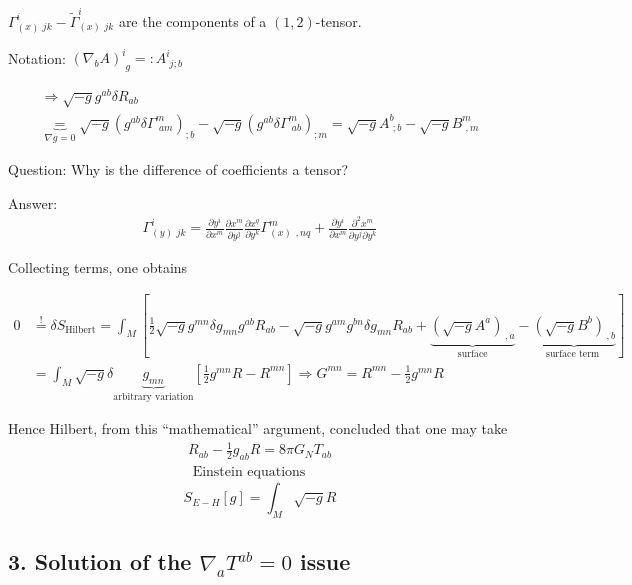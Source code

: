 \documentclass[10pt, twoside]{amsart}
\begin{document}
\begin{multicols*}{2}
$\Gamma^i_{(x) \, \, jk } - \widetilde{\Gamma}^i_{ (x) \, \, jk }$ are the components of a $(1,2)$-tensor.

Notation: $(\nabla_b A)^i_{ \, \, g} =: A^i_{ \, \, j;b}$

\[
\begin{gathered}
\Longrightarrow \sqrt{-g} g^{ab} \delta R_{ab}  \\
\underbrace{=}_{ \nabla g = 0 } \sqrt{-g} (g^{ab} \delta \Gamma^m_{ \, \, am} )_{;b} - \sqrt{-g} (g^{ab} \delta \Gamma^m_{ \, \, ab} )_{ ; m} = \sqrt{-g} A^b_{ \, \, ; b} - \sqrt{-g} B^m_{ \, \, , m }
\end{gathered}
\]

Question: Why is the difference of coefficients a tensor?

Answer:
\[
\begin{aligned}
\Gamma_{(y) \, \, jk}^i = \frac{ \partial y^i}{ \partial x^m} \frac{ \partial x^m}{ \partial y^j} \frac{ \partial x^q}{ \partial y^k} \Gamma^m_{(x) \,\ , nq} + \frac{ \partial y^i}{ \partial x^m} \frac{ \partial^2 x^m}{ \partial y^j \partial y^k}
\end{aligned}
\]

Collecting terms, one obtains

\[
\begin{aligned}
  0 & \overset{!}{=} \delta S_{\text{Hilbert}} = \int_M [ \frac{1}{2} \sqrt{-g} g^{mn} \delta g_{mn} g^{ab} R_{ab} - \sqrt{-g} g^{am} g^{bn} \delta g_{mn} R_{ab}+    \underbrace{ (\sqrt{-g}A^a)_{ \, , a} }_{ \text{surface} } - \underbrace{ ( \sqrt{-g} B^b)_{ \, , b } }_{ \text{surface term } } ] \\
  & = \int_M \sqrt{-g} \delta \underbrace{g_{mn}}_{ \text{arbitrary variation}} [ \frac{1}{2} g^{mn} R - R^{mn} ] \Longrightarrow G^{mn} = R^{mn} - \frac{1}{2} g^{mn} R
\end{aligned}
\]

Hence Hilbert, from this ``mathematical'' argument, concluded that one may take
\[
\begin{gathered}
\boxed{ R_{ab} - \frac{1}{2} g_{ab} R = 8 \pi G_N T_{ab} }  \\
 \text{ Einstein equations}
\end{gathered}
\]
\[
S_{E-H}[g] = \int_M \sqrt{-g}R
\]

\subsection{3. Solution of the $\nabla_a T^{ab} =0$ issue}


\end{multicols*}
\end{document}
